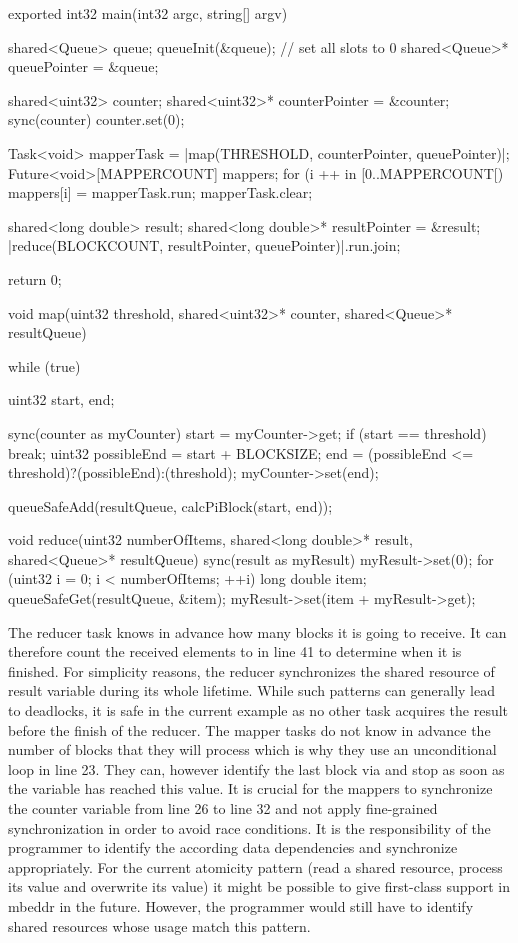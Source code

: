 \begin{ccode}
exported int32 main(int32 argc, string[] argv) { 
  shared<Queue> queue; 
  queueInit(&queue);  // set all slots to 0
  shared<Queue>* queuePointer = &queue; 
   
  shared<uint32> counter; 
  shared<uint32>* counterPointer = &counter; 
  sync(counter) { counter.set(0); } 
   
  Task<void> mapperTask = |map(THRESHOLD, counterPointer, queuePointer)|; 
  Future<void>[MAPPERCOUNT] mappers; 
  for (i ++ in [0..MAPPERCOUNT[) { mappers[i] = mapperTask.run; }
  mapperTask.clear; 
   
  shared<long double> result; 
  shared<long double>* resultPointer = &result;  
  |reduce(BLOCKCOUNT, resultPointer, queuePointer)|.run.join; 
  
  return 0; 
}
 
void map(uint32 threshold, shared<uint32>* counter, shared<Queue>* resultQueue) { 
  while (true) { 
    uint32 start, end; 
     
    sync(counter as myCounter) { 
      start = myCounter->get; 
      if (start == threshold) { break; }
      uint32 possibleEnd = start + BLOCKSIZE; 
      end = (possibleEnd <= threshold)?(possibleEnd):(threshold); 
      myCounter->set(end); 
    } 
     
    queueSafeAdd(resultQueue, calcPiBlock(start, end)); 
  }
}
 
void reduce(uint32 numberOfItems, shared<long double>* result, shared<Queue>* resultQueue) { 
  sync(result as myResult) { 
    myResult->set(0); 
    for (uint32 i = 0; i < numberOfItems; ++i) { 
      long double item; 
      queueSafeGet(resultQueue, &item); 
      myResult->set(item + myResult->get); 
    }
  } 
}
\end{ccode}

The reducer task knows in advance how many blocks it is going to receive. It can therefore count the received elements to in line 41 to determine when it is finished. For simplicity reasons, the reducer synchronizes the shared resource of result variable during its whole lifetime. While such patterns can generally lead to deadlocks, it is safe in the current example as no other task acquires the result before the finish of the reducer. The mapper tasks do not know in advance the number of blocks that they will process which is why they use an unconditional loop in line 23. They can, however identify the last block via  and stop as soon as the  variable has reached this value. It is crucial for the mappers to synchronize the counter variable from line 26 to line 32 and not apply fine-grained synchronization in order to avoid race conditions. It is the responsibility of the programmer to identify the according data dependencies and synchronize appropriately. For the current atomicity pattern (read a shared resource, process its value and overwrite its value) it might be possible to give first-class support in mbeddr in the future. However, the programmer would still have to identify shared resources whose usage match this pattern.

